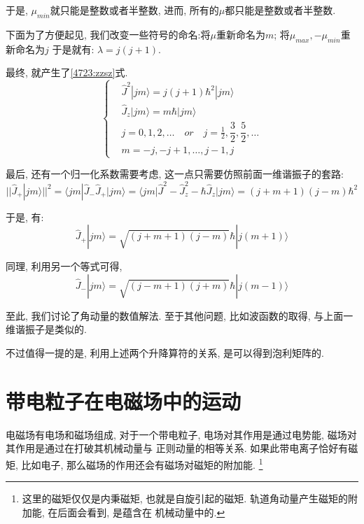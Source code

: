 \documentclass[a4paper, 11pt]{article}
\begin{document}
\begin{spacing}{1.2}
      于是, $\mu_{min}$就只能是整数或者半整数, 进而, 所有的$\mu$都只能是整数或者半整数. 

      下面为了方便起见, 我们改变一些符号的命名:将$\mu$重新命名为$m$; 将$\mu_{max}, -\mu_{min}$重新命名为$j$
      于是就有: $\lambda = j(j+1)$. 

      最终, 就产生了\eqref{4723:zzsz}式.   
      \begin{equation*}
        \left\{
        \begin{aligned}
          &\hat{J}^2|jm\rangle = j(j+1)\hbar^2|jm\rangle\\
          &\hat{J}_z|jm\rangle = m\hbar|jm\rangle \\
          &j = 0,1,2,\ldots \quad or \quad j=\frac{1}{2}, \dfrac{3}{2}, \dfrac{5}{2}, \ldots\\
          &m = -j, -j+1, \ldots, j-1, j
        \end{aligned}\right.
      \end{equation*}

      最后, 还有一个归一化系数需要考虑, 这一点只需要仿照前面一维谐振子的套路:
      \begin{equation}
        \big|\big|\hat{J}_+|jm\rangle\big|\big|^2 = \langle{}jm|\hat{J}_-\hat{J}_+|jm\rangle%
        =\langle{}jm|\hat{J}^2 - \hat{J}_z^2-\hbar\hat{J}_z|jm\rangle%
        =(j+m+1)(j-m)\hbar^2
      \end{equation}
      
      于是, 有:
      \begin{equation}
        \hat{J}_+|jm\rangle = \sqrt{(j+m+1)(j-m)}\hbar|j(m+1)\rangle
      \end{equation}

      同理, 利用另一个等式可得, 
      \begin{equation}
        \hat{J}_-|jm\rangle = \sqrt{(j-m+1)(j+m)}\hbar|j(m-1)\rangle
      \end{equation}

      至此, 我们讨论了角动量的数值解法. 至于其他问题, 比如波函数的取得, 与上面一维谐振子是类似的.

      不过值得一提的是, 利用上述两个升降算符的关系, 是可以得到泡利矩阵的.


    \section{带电粒子在电磁场中的运动}
    电磁场有电场和磁场组成, 对于一个带电粒子, 电场对其作用是通过电势能, 磁场对其作用是通过在打破其机械动量与
    正则动量的相等关系. 如果此带电离子恰好有磁矩, 比如电子, 那么磁场的作用还会有磁场对磁矩的附加能. 
    \footnote{这里的磁矩仅仅是内秉磁矩, 也就是自旋引起的磁矩. 轨道角动量产生磁矩的附加能, 在后面会看到, 是蕴含在
    机械动量中的.}


\end{spacing}
\end{document}
